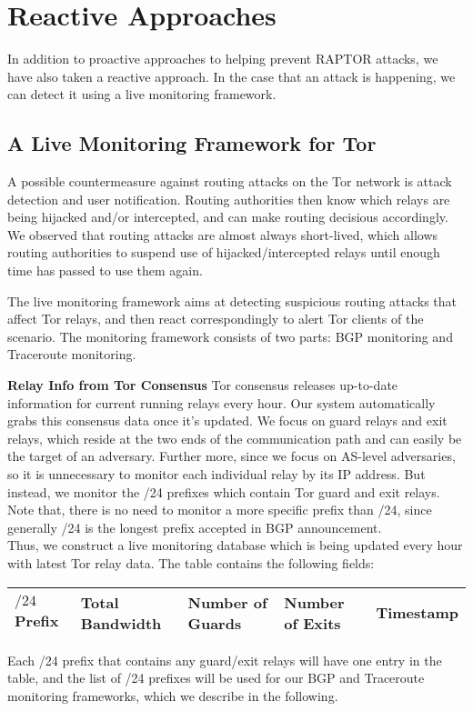 \section{Reactive Approaches}
In addition to proactive approaches to helping prevent RAPTOR attacks, we have also taken a reactive approach.  In the case that an attack is happening, we can detect it using a live monitoring framework.

\subsection{A Live Monitoring Framework for Tor}
A possible countermeasure against routing attacks on the Tor network is attack 
detection and user notification.  Routing authorities then know which relays are 
being hijacked and/or intercepted, and can make routing decisious accordingly.  
We observed that routing attacks are almost always short-lived, which allows 
routing authorities to suspend use of hijacked/intercepted relays until enough 
time has passed to use them again.

The live monitoring framework aims at detecting suspicious routing attacks that affect Tor relays, and then react correspondingly to alert Tor clients of the scenario. The monitoring framework consists of two parts: BGP monitoring and Traceroute monitoring.

{\bf Relay Info from Tor Consensus} Tor consensus releases up-to-date information for current running relays every hour. Our system automatically grabs this consensus data once it's updated. We focus on guard relays and exit relays, which reside at the two ends of the communication path and can easily be the target of an adversary. Further more, since we focus on AS-level adversaries, so it is unnecessary to monitor each individual relay by its IP address. But instead, we monitor the /24 prefixes which contain Tor guard and exit relays. Note that, there is no need to monitor a more specific prefix than /24, since generally /24 is the longest prefix accepted in BGP announcement. \\
Thus, we construct a live monitoring database which is being updated every hour with latest Tor relay data. The table contains the following fields:
\begin{center}
\begin{tabular}{ p{8mm} | p{1.4cm} | p{1.3cm} | p{1.3cm} | p{1.3cm}}
  \hline			
  $/24$ Prefix & Total Bandwidth & Number of Guards & Number of Exits & Timestamp \\
  \hline  
\end{tabular}
\label{tab:relayinfo}
\end{center}
Each /24 prefix that contains any guard/exit relays will have one entry in the table, and the list of /24 prefixes will be used for our BGP and Traceroute monitoring frameworks, which we describe in the following. 

